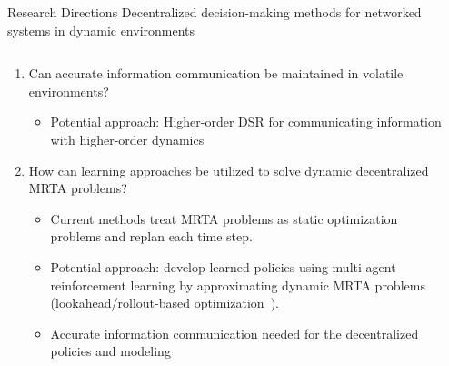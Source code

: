 \begin{frame}{Research Directions}
    Decentralized decision-making methods for networked systems in dynamic environments
    \begin{columns}
    \begin{column}{0.65\textwidth}
        \begin{enumerate}
        \addtolength{\itemindent}{0.5cm}
        \item Can accurate information communication be maintained in volatile environments?
        \begin{itemize}
            \item Potential approach: Higher-order DSR for communicating information with higher-order dynamics
        \end{itemize}
        \pause
        \item How can learning approaches be utilized to solve dynamic decentralized MRTA problems?
        \begin{itemize}
            \item Current methods treat MRTA problems as static optimization problems and replan each time step.
            \item Potential approach: develop learned policies using multi-agent reinforcement learning by approximating dynamic MRTA problems (lookahead/rollout-based optimization~\cite{bhattacharya2021multiagent}).
            \item Accurate information communication needed for the decentralized policies and modeling   
        \end{itemize}
        \end{enumerate}
        \end{column}
        \begin{column}{0.5\textwidth}
        \end{column}
    \end{columns}
        
\end{frame}

